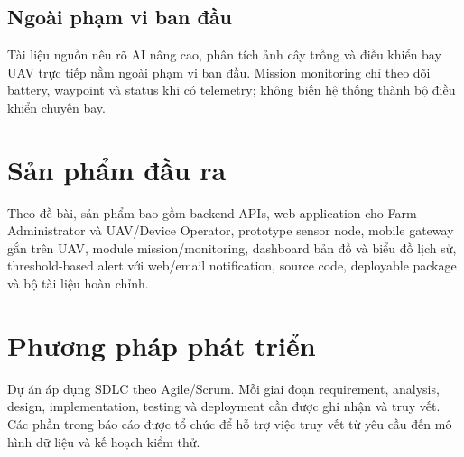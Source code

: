 \subsection{Ngoài phạm vi ban đầu}
Tài liệu nguồn nêu rõ AI nâng cao, phân tích ảnh cây trồng và điều khiển bay UAV trực tiếp nằm ngoài phạm vi ban đầu. Mission monitoring chỉ theo dõi battery, waypoint và status khi có telemetry; không biến hệ thống thành bộ điều khiển chuyến bay.

\section{Sản phẩm đầu ra}
Theo đề bài, sản phẩm bao gồm backend APIs, web application cho Farm Administrator và UAV/Device Operator, prototype sensor node, mobile gateway gắn trên UAV, module mission/monitoring, dashboard bản đồ và biểu đồ lịch sử, threshold-based alert với web/email notification, source code, deployable package và bộ tài liệu hoàn chỉnh.

\section{Phương pháp phát triển}
Dự án áp dụng SDLC theo Agile/Scrum. Mỗi giai đoạn requirement, analysis, design, implementation, testing và deployment cần được ghi nhận và truy vết. Các phần trong báo cáo được tổ chức để hỗ trợ việc truy vết từ yêu cầu đến mô hình dữ liệu và kế hoạch kiểm thử.
